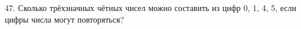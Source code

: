 47. Сколько трёхзначных чётных чисел можно составить из цифр 0, 1, 4, 5, если цифры числа могут повторяться?\\
